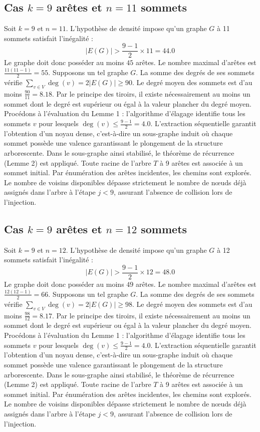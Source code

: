 \documentclass[12pt,a4paper]{article}
\begin{document}
\subsection{Cas $k = 9$ arêtes et $n = 11$ sommets}
Soit $k = 9$ et $n = 11$. L'hypothèse de densité impose qu'un graphe $G$ à 11 sommets satisfait l'inégalité :
$$ |E(G)| > \frac{9-1}{2} \times 11 = 44.0 $$
Le graphe doit donc posséder au moins $45$ arêtes. Le nombre maximal d'arêtes est $\frac{11(11-1)}{2} = 55$.
Supposons un tel graphe $G$. La somme des degrés de ses sommets vérifie $\sum_{v \in V} \deg(v) = 2|E(G)| \geq 90$.
Le degré moyen des sommets est d'au moins $\frac{90}{11} = 8.18$.
Par le principe des tiroirs, il existe nécessairement au moins un sommet dont le degré est supérieur ou égal à la valeur plancher du degré moyen.
Procédons à l'évaluation du Lemme 1 : l'algorithme d'élagage identifie tous les sommets $v$ pour lesquels $\deg(v) \leq \frac{9-1}{2} = 4.0$.
L'extraction séquentielle garantit l'obtention d'un noyau dense, c'est-à-dire un sous-graphe induit où chaque sommet possède une valence garantissant le plongement de la structure arborescente.
Dans le sous-graphe ainsi stabilisé, le théorème de récurrence (Lemme 2) est appliqué. Toute racine de l'arbre $T$ à 9 arêtes est associée à un sommet initial. Par énumération des arêtes incidentes, les chemins sont explorés. Le nombre de voisins disponibles dépasse strictement le nombre de nœuds déjà assignés dans l'arbre à l'étape $j < 9$, assurant l'absence de collision lors de l'injection.

\subsection{Cas $k = 9$ arêtes et $n = 12$ sommets}
Soit $k = 9$ et $n = 12$. L'hypothèse de densité impose qu'un graphe $G$ à 12 sommets satisfait l'inégalité :
$$ |E(G)| > \frac{9-1}{2} \times 12 = 48.0 $$
Le graphe doit donc posséder au moins $49$ arêtes. Le nombre maximal d'arêtes est $\frac{12(12-1)}{2} = 66$.
Supposons un tel graphe $G$. La somme des degrés de ses sommets vérifie $\sum_{v \in V} \deg(v) = 2|E(G)| \geq 98$.
Le degré moyen des sommets est d'au moins $\frac{98}{12} = 8.17$.
Par le principe des tiroirs, il existe nécessairement au moins un sommet dont le degré est supérieur ou égal à la valeur plancher du degré moyen.
Procédons à l'évaluation du Lemme 1 : l'algorithme d'élagage identifie tous les sommets $v$ pour lesquels $\deg(v) \leq \frac{9-1}{2} = 4.0$.
L'extraction séquentielle garantit l'obtention d'un noyau dense, c'est-à-dire un sous-graphe induit où chaque sommet possède une valence garantissant le plongement de la structure arborescente.
Dans le sous-graphe ainsi stabilisé, le théorème de récurrence (Lemme 2) est appliqué. Toute racine de l'arbre $T$ à 9 arêtes est associée à un sommet initial. Par énumération des arêtes incidentes, les chemins sont explorés. Le nombre de voisins disponibles dépasse strictement le nombre de nœuds déjà assignés dans l'arbre à l'étape $j < 9$, assurant l'absence de collision lors de l'injection.
\end{document}
